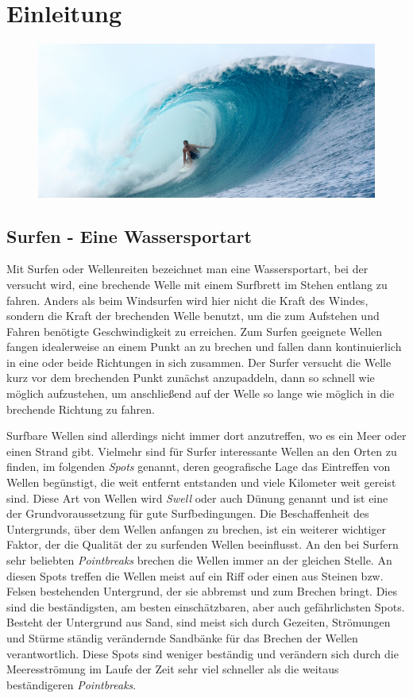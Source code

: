
\chapter{Einleitung}

\begin{figure}[h]
  \includegraphics[width=\textwidth]{bilder/intro}
\end{figure}

\section{Surfen - Eine Wassersportart}
Mit Surfen oder Wellenreiten bezeichnet man eine Wassersportart, bei
der versucht wird, eine brechende Welle mit einem Surfbrett im Stehen
entlang zu fahren. Anders als beim Windsurfen wird hier nicht die
Kraft des Windes, sondern die Kraft der brechenden Welle benutzt, um
die zum Aufstehen und Fahren benötigte Geschwindigkeit zu
erreichen. Zum Surfen geeignete Wellen fangen idealerweise an einem
Punkt an zu brechen und fallen dann kontinuierlich in eine oder beide
Richtungen in sich zusammen. Der Surfer versucht die Welle kurz vor
dem brechenden Punkt zunächst anzupaddeln, dann so schnell wie möglich
aufzustehen, um anschließend auf der Welle so lange wie möglich in die
brechende Richtung zu fahren.

Surfbare Wellen sind allerdings nicht immer dort anzutreffen, wo es
ein Meer oder einen Strand gibt. Vielmehr sind für Surfer interessante
Wellen an den Orten zu finden, im folgenden \textit{Spots} genannt,
deren geografische Lage das Eintreffen von Wellen begünstigt, die weit
entfernt entstanden und viele Kilometer weit gereist sind. Diese Art
von Wellen wird \textit{Swell} oder auch Dünung genannt und ist eine
der Grundvoraussetzung für gute Surfbedingungen. Die Beschaffenheit
des Untergrunds, über dem Wellen anfangen zu brechen, ist ein weiterer
wichtiger Faktor, der die Qualität der zu surfenden Wellen
beeinflusst. An den bei Surfern sehr beliebten \textit{Pointbreaks}
brechen die Wellen immer an der gleichen Stelle. An diesen Spots
treffen die Wellen meist auf ein Riff oder einen aus Steinen
bzw. Felsen bestehenden Untergrund, der sie abbremst und zum Brechen
bringt. Dies sind die beständigsten, am besten einschätzbaren, aber
auch gefährlichsten Spots. Besteht der Untergrund aus Sand, sind meist
sich durch Gezeiten, Strömungen und Stürme ständig verändernde
Sandbänke für das Brechen der Wellen verantwortlich. Diese Spots sind
weniger beständig und verändern sich durch die Meeresströmung im Laufe
der Zeit sehr viel schneller als die weitaus beständigeren
\textit{Pointbreaks}.

